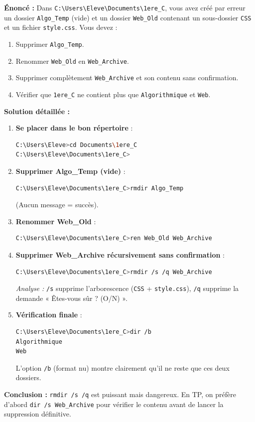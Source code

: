 \documentclass[11pt]{article}
\begin{document}
\begin{exoresolu}
\textbf{Énoncé :} Dans \texttt{C:\textbackslash Users\textbackslash Eleve\textbackslash Documents\textbackslash 1ere\_C}, vous avez créé par erreur un dossier \texttt{Algo\_Temp} (vide) et un dossier \texttt{Web\_Old} contenant un sous-dossier \texttt{CSS} et un fichier \texttt{style.css}. Vous devez :
\begin{enumerate}
    \item Supprimer \texttt{Algo\_Temp}.
    \item Renommer \texttt{Web\_Old} en \texttt{Web\_Archive}.
    \item Supprimer complètement \texttt{Web\_Archive} et son contenu sans confirmation.
    \item Vérifier que \texttt{1ere\_C} ne contient plus que \texttt{Algorithmique} et \texttt{Web}.
\end{enumerate}
\tcblower
\textbf{Solution détaillée :}

\begin{enumerate}
    \item \textbf{Se placer dans le bon répertoire} :
    \begin{lstlisting}[language=bash]
C:\Users\Eleve>cd Documents\1ere_C
C:\Users\Eleve\Documents\1ere_C>
    \end{lstlisting}
    \item \textbf{Supprimer Algo\_Temp (vide)} :
    \begin{lstlisting}[language=bash]
C:\Users\Eleve\Documents\1ere_C>rmdir Algo_Temp
    \end{lstlisting}
    (Aucun message = succès).
    \item \textbf{Renommer Web\_Old} :
    \begin{lstlisting}[language=bash]
C:\Users\Eleve\Documents\1ere_C>ren Web_Old Web_Archive
    \end{lstlisting}
    \item \textbf{Supprimer Web\_Archive récursivement sans confirmation} :
    \begin{lstlisting}[language=bash]
C:\Users\Eleve\Documents\1ere_C>rmdir /s /q Web_Archive
    \end{lstlisting}
    \textit{Analyse :} \texttt{/s} supprime l'arborescence (\texttt{CSS} + \texttt{style.css}), \texttt{/q} supprime la demande « Êtes-vous sûr ? (O/N) ».
    \item \textbf{Vérification finale} :
    \begin{lstlisting}[language=bash]
C:\Users\Eleve\Documents\1ere_C>dir /b
Algorithmique
Web
    \end{lstlisting}
    L'option \texttt{/b} (format nu) montre clairement qu'il ne reste que ces deux dossiers.
\end{enumerate}
\textbf{Conclusion :} \texttt{rmdir /s /q} est puissant mais dangereux. En TP, on préfère d'abord \texttt{dir /s Web\_Archive} pour vérifier le contenu avant de lancer la suppression définitive.
\end{exoresolu}
\end{document}
